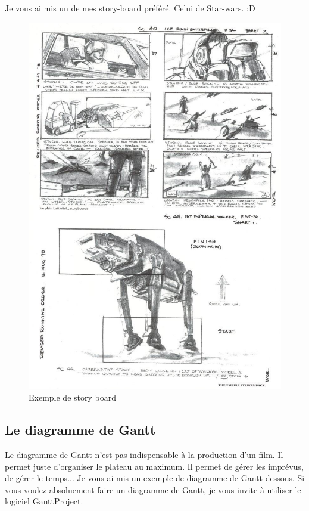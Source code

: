\documentclass{article}
\begin{document}
Je vous ai mis un de mes story-board préféré. Celui de Star-wars. :D

\begin{figure}[p]
\centering
\includegraphics[scale=0.5]{img/story.jpg}
\caption{Exemple de story board}
\label{fig:story}
\end{figure}

\clearpage

	\subsection{Le diagramme de Gantt}

Le diagramme de Gantt n'est pas indispensable à la production d'un film. Il permet juste d'organiser le plateau au maximum. Il permet de gérer les imprévus, de gérer le temps... Je vous ai mis un exemple de diagramme de Gantt dessous. Si vous voulez absoluement faire un diagramme de Gantt, je vous invite à utiliser le logiciel GanttProject. 
\end{document}
